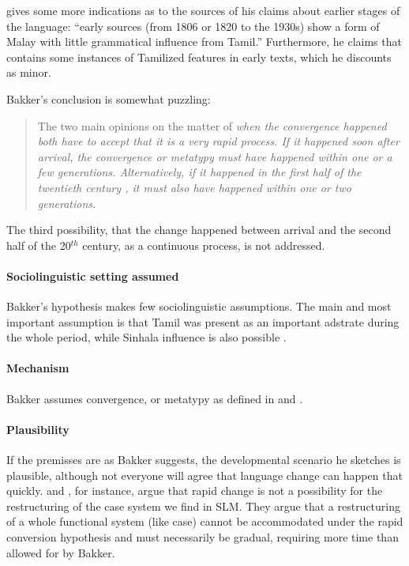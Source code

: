 \citet[152]{Bakker2006} gives some more indications as to the sources of his claims about earlier stages of the language: ``early sources (from 1806 or 1820 to the 1930s) show a form of Malay with little grammatical influence from Tamil.'' Furthermore, he claims that \citet{Hussainmiya1987} contains some instances of Tamilized features in early texts, which he discounts as minor.

Bakker's conclusion is somewhat puzzling:

\begin{quote}
The two main opinions on the matter of \em when \em the convergence happened both have to accept that it is a very rapid process. If it happened soon after arrival, \el{} the convergence or metatypy must have happened within one or a few generations. Alternatively, if it happened in the first half of the twentieth century \el{}, it must also have happened within one or two generations.
\end{quote}

The third possibility, that the change happened between arrival and the second half of the 20$^{th}$ century, as a continuous process, is not addressed.

\paragraph{Sociolinguistic setting assumed}
Bakker's hypothesis  makes few sociolinguistic assumptions. The main and most important assumption is that Tamil was present as an important adstrate during the whole period, while Sinhala influence is also possible \citep[46]{Bakker1995nl}.

\paragraph{Mechanism}
Bakker assumes convergence, or metatypy as defined in \citet{Foley1986} and \citet{Ross1996, Ross2001}.

\paragraph{Plausibility} If the premisses are as Bakker suggests, the developmental scenario he sketches is plausible, although not everyone will agree that language change can happen that quickly.  \citet{Ansaldo2005ms,Ansaldo2008genesis} and \citet{AnsaldoEtAl2007dcctr}, for instance, argue that rapid change is not a possibility for the restructuring of the case system we find in SLM. They argue that a restructuring of a whole functional system (like case) cannot be accommodated under the rapid conversion hypothesis and must necessarily be gradual, requiring more time than allowed for by Bakker.


